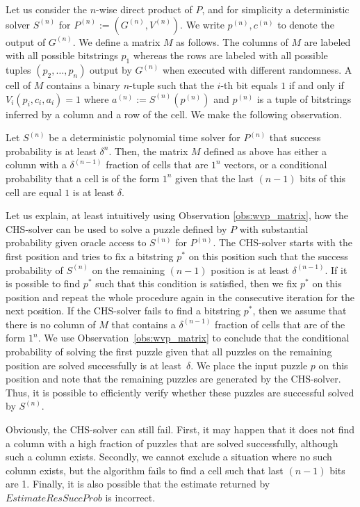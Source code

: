 Let us consider the $n$-wise direct product of $P$, and for simplicity a deterministic solver $S^{(n)}$ for $P^{(n)} := (G^{(n)}, V^{(n)})$.
We write $p^{(n)}, c^{(n)}$ to denote the output of $G^{(n)}$.
We define a matrix $M$ as follows. The columns of $M$ are labeled with all possible bitstrings $p_1$
whereas the rows are labeled with all possible tuples $(p_2, \dotsc, p_n)$ output by $G^{(n)}$ when executed with different randomness.
A cell of $M$ contains a binary $n$-tuple such that the $i$-th bit equals $1$ if and only if $V_i(p_i, c_i, a_i) = 1$ where
 $a^{(n)} := S^{(n)}(p^{(n)})$ and $p^{(n)}$ is a tuple of bitstrings inferred by a column and a row of the cell.
We make the following observation.
%
\begin{observation}
\label{obs:wvp_matrix}
Let $S^{(n)}$ be a deterministic polynomial time solver for $P^{(n)}$ that success probability is at least $\delta^{n}$.
Then, the matrix $M$ defined as above has either a column with a $\delta^{(n-1)}$ fraction of cells that are $1^n$ vectors, or
a conditional probability that a cell is of the form $1^n$ given that the last $(n-1)$ bits of this cell are equal $1$ is at least $\delta$.
\end{observation}
%
Let us explain, at least intuitively using Observation \ref{obs:wvp_matrix}, how the CHS-solver can be used to solve a puzzle defined by $P$
with substantial probability given oracle access to $S^{(n)}$ for $P^{(n)}$.
The CHS-solver starts with the first position and tries to fix a bitstring $p^*$ on this position such that the success probability of $S^{(n)}$ on the remaining $(n-1)$
position is at least $\delta^{(n-1)}$. If it is possible to find $p^*$ such that this condition is satisfied, then we fix $p^*$
on this position and repeat the whole procedure again in the consecutive iteration for the next position.
If the CHS-solver fails to find a bitstring $p^*$, then we assume that there is no column of $M$ that contains a $\delta^{(n-1)}$ fraction
of cells that are of the form $1^n$. We use Observation~\ref{obs:wvp_matrix} to conclude that the conditional probability of
solving the first puzzle given that all puzzles on the remaining position are solved successfully is at least~$\delta$.
We place the input puzzle $p$ on this position and note that the remaining puzzles are generated by the CHS-solver.
Thus, it is possible to efficiently verify whether these puzzles are successful solved by $S^{(n)}$.

Obviously, the CHS-solver can still fail. First, it may happen that it does not find a column
with a high fraction of puzzles that are solved successfully, although such a column exists.
Secondly, we cannot exclude a situation where no such column exists, but the algorithm fails to find a cell such that last $(n\!-\!1)$ bits are 1.
Finally, it is also possible that the estimate returned by $\mathit{EstimateResSuccProb}$ is incorrect.

